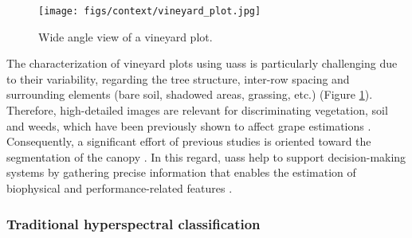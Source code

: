 \begin{figure}[ht]
	\texttt{[image: figs/context/vineyard\_plot.jpg]}
	\caption{Wide angle view of a vineyard plot.}
    \label{fig:vineyard_plot_sample}
\end{figure}

The characterization of vineyard plots using \acrshort{uas}s is particularly challenging due to their variability, regarding the tree structure, inter-row spacing and surrounding elements (bare soil, shadowed areas, grassing, etc.) (Figure \ref{fig:vineyard_plot_sample}). Therefore, high-detailed images are relevant for discriminating vegetation, soil and weeds, which have been previously shown to affect grape estimations \cite{ammoniaci_state_2021, sassu_advances_2021}. Consequently, a significant effort of previous studies is oriented toward the segmentation of the canopy \cite{padua_vineyard_2022}. In this regard, \acrshort{uas}s help to support decision-making systems by gathering precise information that enables the estimation of biophysical and performance-related features \cite{bramley_12_2010}.

\subsubsection{Traditional hyperspectral classification}

